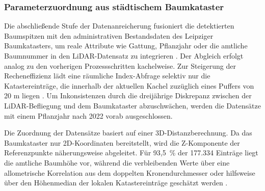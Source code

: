 \subsubsection{Parameterzuordnung aus städtischem Baumkataster}

Die abschließende Stufe der Datenanreicherung fusioniert die detektierten Baumspitzen mit den administrativen Bestandsdaten des Leipziger Baumkatasters, um reale Attribute wie Gattung, Pflanzjahr oder die amtliche Baumnummer in den LiDAR-Datensatz zu integrieren \cite{munzingerMappingUrbanForest2022}. Der Abgleich erfolgt analog zu den vorherigen Prozessschritten kachelweise. Zur Steigerung der Recheneffizienz lädt eine räumliche Index-Abfrage selektiv nur die Katastereinträge, die innerhalb der aktuellen Kachel zuzüglich eines Puffers von 20 m liegen \cite{munzingerMappingUrbanForest2022}. Um Inkonsistenzen durch die dreijährige Diskrepanz zwischen der LiDAR-Befliegung und dem Baumkataster abzuschwächen, werden die Datensätze mit einem Pflanzjahr nach 2022 vorab ausgeschlossen.

Die Zuordnung der Datensätze basiert auf einer 3D-Distanzberechnung. Da das Baumkataster nur 2D-Koordinaten bereitstellt, wird die Z-Komponente der Referenzpunkte näherungsweise abgeleitet. Für 93,5~\% der 177.334 Einträge liegt die amtliche Baumhöhe vor, während die verbleibenden Werte über eine allometrische Korrelation aus dem doppelten Kronendurchmesser oder hilfsweise über den Höhenmedian der lokalen Katastereinträge geschätzt werden \cite{munzingerMappingUrbanForest2022}.

